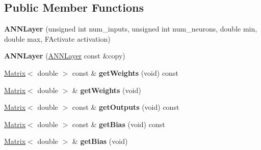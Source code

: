 \subsection*{Public Member Functions}
\begin{DoxyCompactItemize}
\item 
\hypertarget{class_g_a_n_n_1_1_a_n_n_layer_a98a15401495eddad363a75c2ab9c5773}{}{\bfseries A\+N\+N\+Layer} (unsigned int num\+\_\+inputs, unsigned int num\+\_\+neurons, double min, double max, F\+Activate activation)\label{class_g_a_n_n_1_1_a_n_n_layer_a98a15401495eddad363a75c2ab9c5773}

\item 
\hypertarget{class_g_a_n_n_1_1_a_n_n_layer_a89236bd33096986ab0efa417d4cbcb1c}{}{\bfseries A\+N\+N\+Layer} (\hyperlink{class_g_a_n_n_1_1_a_n_n_layer}{A\+N\+N\+Layer} const \&copy)\label{class_g_a_n_n_1_1_a_n_n_layer_a89236bd33096986ab0efa417d4cbcb1c}

\item 
\hypertarget{class_g_a_n_n_1_1_a_n_n_layer_a53907cae383f48d74ec7377665d99748}{}\hyperlink{class_g_a_n_n_1_1_matrix}{Matrix}$<$ double $>$ const \& {\bfseries get\+Weights} (void) const \label{class_g_a_n_n_1_1_a_n_n_layer_a53907cae383f48d74ec7377665d99748}

\item 
\hypertarget{class_g_a_n_n_1_1_a_n_n_layer_ae91b6f9960dfea801080512dc5d9b224}{}\hyperlink{class_g_a_n_n_1_1_matrix}{Matrix}$<$ double $>$ \& {\bfseries get\+Weights} (void)\label{class_g_a_n_n_1_1_a_n_n_layer_ae91b6f9960dfea801080512dc5d9b224}

\item 
\hypertarget{class_g_a_n_n_1_1_a_n_n_layer_a73e68bd212308c07f0e189cac0ce1f78}{}\hyperlink{class_g_a_n_n_1_1_matrix}{Matrix}$<$ double $>$ const \& {\bfseries get\+Outputs} (void) const \label{class_g_a_n_n_1_1_a_n_n_layer_a73e68bd212308c07f0e189cac0ce1f78}

\item 
\hypertarget{class_g_a_n_n_1_1_a_n_n_layer_a667dafc7ab40773bbd6bc32553bd4cb0}{}\hyperlink{class_g_a_n_n_1_1_matrix}{Matrix}$<$ double $>$ const \& {\bfseries get\+Bias} (void) const \label{class_g_a_n_n_1_1_a_n_n_layer_a667dafc7ab40773bbd6bc32553bd4cb0}

\item 
\hypertarget{class_g_a_n_n_1_1_a_n_n_layer_a35de727d75d940dd9614ecdf0f1327ca}{}\hyperlink{class_g_a_n_n_1_1_matrix}{Matrix}$<$ double $>$ \& {\bfseries get\+Bias} (void)\label{class_g_a_n_n_1_1_a_n_n_layer_a35de727d75d940dd9614ecdf0f1327ca}


\end{DoxyCompactItemize}
